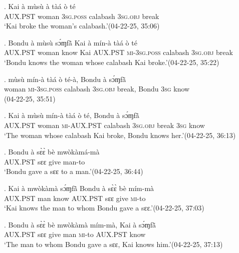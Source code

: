 \documentclass{assets/fieldnotes}
\begin{document}
\exg. Kai à mùsù à tàá ò té\\
{} \textsc{AUX.PST} woman \textsc{3sg.poss} calabash \textsc{3sg.obj} break\\
`Kai broke the woman’s calabash.’\hfill{(04-22-25, 35:06)}

\exg. Bondu à mùsù sɔ́ɱfã̀ Kai à mín-à tàá ò té\\
{} \textsc{AUX.PST} woman know Kai \textsc{AUX.PST} \textsc{mi-3sg.poss} calabash \textsc{3sg.obj} break\\
`Bondu knows the woman whose calabash Kai broke.’\hfill{(04-22-25, 35:22)}

\exg. mùsù mín-à tàá ò té-à, Bondu à sɔ́ɱfã̀\\
woman \textsc{mi-3sg.poss} calabash \textsc{3sg.obj} break, Bondu \textsc{3sg} know\\
\hfill{(04-22-25, 35:51)}

\exg. Kai à mùsù mín-à tàá ò té, Bondu à sɔ́ɱfã̀\\
{} \textsc{AUX.PST} woman \textsc{mi-AUX.PST} calabash \textsc{3sg.obj} break {} \textsc{3sg} know\\
`The woman whose calabash Kai broke, Bondu knows her.’\hfill{(04-22-25, 36:13)}


\exg. Bondu à sɛ̀ɛ̀ bè mwòkàmá-mà\\
{} \textsc{AUX.PST} sɛɛ give man-to\\
`Bondu gave a sɛɛ to a man.’\hfill{(04-22-25, 36:44)}\\

\exg. Kai à mwòkàmà sɔ́ɱfã̀ Bondu à sɛ̀ɛ̀ bè mím-mà\\
{} \textsc{AUX.PST} man know {} \textsc{AUX.PST} sɛɛ give \textsc{mi}-to\\
`Kai knows the man to whom Bondu gave a sɛɛ.’\hfill{(04-22-25, 37:03)}

\exg. Bondu à sɛ̀ɛ̀ bè mwòkàmà mím-mà, Kai à sɔ́ɱfã̀\\
{} \textsc{AUX.PST} sɛɛ give man \textsc{mi}-to {} \textsc{AUX.PST} know\\
`The man to whom Bondu gave a sɛɛ, Kai knows him.’\hfill{(04-22-25, 37:13)}
\end{document}
